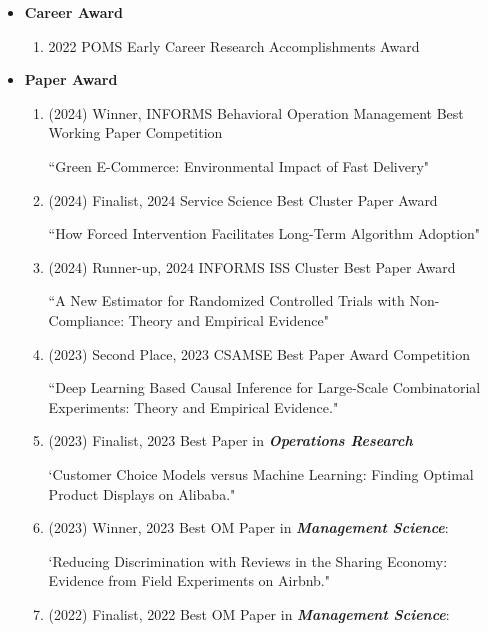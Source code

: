 \documentclass[10pt]{article}
\newenvironment{outerlist}[1][\enskip\textbullet]%
        {\begin{itemize}[#1,leftmargin=*]}{\end{itemize}%
         \vspace{-.6\baselineskip}}
\begin{document}
\begin{outerlist}
    \item {\bf Career Award}
    \begin{enumerate}
    
    \item 2022 POMS Early Career Research Accomplishments Award
    
    \end{enumerate}
    
    \item {\bf Paper Award}
    \begin{enumerate}

    \item (2024) Winner, INFORMS Behavioral Operation Management Best Working Paper Competition

    {\footnotesize ``Green E-Commerce: Environmental Impact of Fast Delivery"}

    \item (2024) Finalist, 2024 Service Science Best Cluster Paper Award

    {\footnotesize ``How Forced Intervention Facilitates Long-Term Algorithm Adoption"}
    
    \item (2024) Runner-up, 2024 INFORMS ISS Cluster Best Paper Award

    {\footnotesize ``A New Estimator for Randomized Controlled Trials with Non-Compliance: Theory and Empirical Evidence"}

    \item (2023) Second Place, 2023 CSAMSE Best Paper Award Competition

    {\footnotesize ``Deep Learning Based Causal Inference for Large-Scale Combinatorial Experiments: Theory and Empirical Evidence."}

    \item (2023) Finalist, 2023 Best Paper in \textbf{\textit{Operations Research}}
    
    {\footnotesize `Customer Choice Models versus Machine Learning: Finding Optimal Product Displays on Alibaba."}

    \item (2023) Winner, 2023 Best OM Paper in \textbf{\textit{Management Science}}:
    
    {\footnotesize `Reducing Discrimination with Reviews in the Sharing Economy: Evidence from Field Experiments on Airbnb."}

    \item (2022) Finalist, 2022 Best OM Paper in \textbf{\textit{Management Science}}:
    

\end{enumerate}
\end{outerlist}
\end{document}
